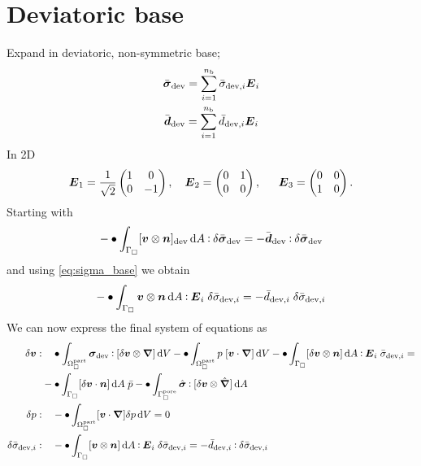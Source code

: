 \documentclass[a4paper]{article}
\newcommand{\pore}{\mathrm{pore}}
\newcommand{\particle}{\mathrm{part}}
\begin{document}
\newpage

\section*{Deviatoric base}
Expand in deviatoric, non-symmetric base;
\begin{subequations}
\begin{gather}
 \bar{\boldsymbol{\sigma}}_{\mathrm{dev}} = \sum_{i=1}^{n_{\mathrm{b}}} \bar{\sigma}_{\mathrm{dev},i} \boldsymbol{E}_i
\label{eq:sigma_base} \\
 \bar{\boldsymbol{d}}_{\mathrm{dev}} = \sum_{i=1}^{n_{\mathrm{b}}} \bar{d}_{\mathrm{dev},i} \boldsymbol{E}_i
\label{eq:d_base} \\
\end{gather}
\end{subequations}
In 2D
\begin{align}
 \boldsymbol{E}_1 = \frac{1}{\sqrt{2}}\begin{pmatrix}1 & 0 \\ 0 & -1\end{pmatrix}, \quad
 \boldsymbol{E}_2 = \begin{pmatrix}0 & 1 \\ 0 & 0\end{pmatrix},\;\quad\;
 \boldsymbol{E}_3 = \begin{pmatrix}0 & 0 \\ 1 & 0\end{pmatrix}.
\end{align}
Starting with
\begin{gather}
 -\bullet\int_{\Gamma_\Box} [\boldsymbol{v} \mathbin{\otimes} \boldsymbol{n}]_{\mathrm{dev}} \operatorname{d \!} A \mathbin{\vcentcolon} \delta\bar{\boldsymbol{\sigma}}_{\mathrm{dev}} = -\bar{\boldsymbol{d}}_{\mathrm{dev}} \mathbin{\vcentcolon} \delta\bar{\boldsymbol{\sigma}}_{\mathrm{dev}}
\end{gather}
and using \eqref{eq:sigma_base} we obtain
\begin{gather}
 -\bullet\int_{\Gamma_\Box} \boldsymbol{v} \mathbin{\otimes} \boldsymbol{n} \operatorname{d \!} A \mathbin{\vcentcolon} \boldsymbol{E}_i \;\delta\bar{\sigma}_{\mathrm{dev},i} = -\bar{d}_{\mathrm{dev},i} \;\delta\bar{\sigma}_{\mathrm{dev},i} 
\end{gather}
We can now express the final system of equations as
\begin{subequations}
\begin{align}
 \delta\ta v :&\quad 
 \bullet \int_{\Omega_\Box^\particle} \ts\sigma_\dev \dprod [\delta\ta v\outerp\diff]\dif V - \bullet\int_{\Omega_\Box^\particle} p\;[\ta v\cdot\diff] \dif V 
  -\bullet \int_{\Gamma_\Box} [\delta\ta v\outerp\ta n]\dif A\dprod \ts E_i\;\bar{\sigma}_{\dev,i}
  = \nonumber\\&-\bullet\int_{\Gamma_\Box}[\delta\ta v\cdot \ta n]\dif A\;\bar{p} - \bullet\int_{\Gamma_\Box^\pore} \hat{\ts\sigma} \dprod [\delta\ta v\outerp\hat{\diff}]\dif A
 \\
 \delta p :&\quad 
 -\bullet \int_{\Omega_\Box^\particle} [\ta v\cdot\diff] \delta p\dif V = 0
 \\
 \delta\bar{\sigma}_{\dev,i} :&\quad
 -\bullet \int_{\Gamma_\Box} [\ta v\outerp\ta n] \dif A \dprod \ts E_i \; \delta\bar{\sigma}_{\dev,i} = -\bar{d}_{\dev,i} \dprod \delta\bar{\sigma}_{\dev,i}
\end{align}
\end{subequations}
\end{document}
